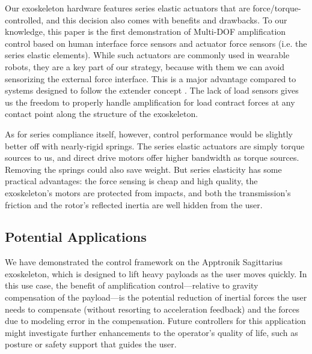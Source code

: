 \documentclass[utf8]{frontiersSCNS}
\renewcommand*{\cite}[1]{\citep{#1}}
\begin{document}
Our exoskeleton hardware features series elastic actuators that are force/torque-controlled, and this decision also comes with benefits and drawbacks.
To our knowledge, this paper is the first demonstration of Multi-DOF amplification control based on human interface force sensors and actuator force sensors (i.e. the series elastic elements).
While such actuators are commonly used in wearable robots, they are a key part of our strategy, because with them we can avoid sensorizing the external force interface.
This is a major advantage compared to systems designed to follow the extender concept \cite{KazerooniGuo1993JDSMC}.
The lack of load sensors gives us the freedom to properly handle amplification for load contract forces at any contact point along the structure of the exoskeleton.

As for series compliance itself, however, control performance would be slightly better off with nearly-rigid springs.
The series elastic actuators are simply torque sources to us, and direct drive motors offer higher bandwidth as torque sources.
Removing the springs could also save weight.
But series elasticity has some practical advantages: the force sensing is cheap and high quality, the exoskeleton's motors are protected from impacts, and both the transmission's friction and the rotor's reflected inertia are well hidden from the user.


\subsection{Potential Applications}

We have demonstrated the control framework on the Apptronik Sagittarius exoskeleton, which is designed to lift heavy payloads as the user moves quickly.
In this use case, the benefit of amplification control---relative to gravity compensation of the payload---is the potential reduction of inertial forces the user needs to compensate (without resorting to acceleration feedback) and the forces due to modeling error in the compensation. Future controllers for this application might investigate further enhancements to the operator's quality of life, such as posture or safety support that guides the user.
\end{document}
